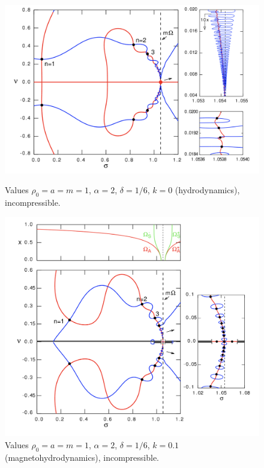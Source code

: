 \documentclass[12pt]{article}
\begin{document}
\begin{figure}[h]
	\centering
	\begin{minipage}{0.50\textwidth}
		\centering
		\includegraphics[width=\textwidth]{RTI_HD.png}
		\caption{Values $\rho_0 = a = m = 1$, $\alpha = 2$, $\delta = 1/6$, $k = 0$ (hydrodynamics), incompressible.}
	\end{minipage}\hfill
	\begin{minipage}{0.45\textwidth}
		\centering
	\includegraphics[width=\textwidth]{RTI_MHD.png}
\caption{Values $\rho_0 = a = m = 1$, $\alpha = 2$, $\delta = 1/6$, $k = 0.1$ (magnetohydrodynamics), incompressible.}
	\end{minipage}
\end{figure}
\end{document}
